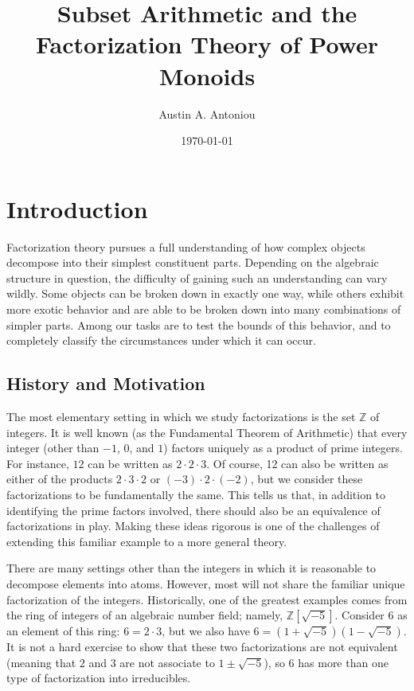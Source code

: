 \documentclass{report}
\title{Subset Arithmetic and the Factorization Theory of Power Monoids}
\author{Austin A. Antoniou}
\date{\today}
\newcommand{\ZZ}{\mathbb{Z}}
\renewcommand{\:}{\text{:}}
\theoremstyle{definition}
\begin{document}
\maketitle

\tableofcontents


\chapter{Introduction}

Factorization theory pursues a full understanding of how complex objects decompose into their simplest constituent parts.  
Depending on the algebraic structure in question, the difficulty of gaining such an understanding can vary wildly. 
Some objects can be broken down in exactly one way, while others exhibit more exotic behavior and are able to be broken down into many combinations of simpler parts.
Among our tasks are to test the bounds of this behavior, and to completely classify the circumstances under which it can occur.


\section{History and Motivation}

The most elementary setting in which we study factorizations is the set $\ZZ$ of integers.
It is well known (as the Fundamental Theorem of Arithmetic) that every integer (other than $-1$, $0$, and $1$) factors uniquely as a product of prime integers.
For instance, $12$ can be written as $2\cdot 2\cdot 3$.
Of course, 12 can also be written as either of the products $2\cdot 3\cdot 2$ or $(-3)\cdot 2\cdot (-2)$, but we consider these factorizations to be fundamentally the same.  
This tells us that, in addition to identifying the prime factors involved, there should also be an equivalence of factorizations in play.
Making these ideas rigorous is one of the challenges of extending this familiar example to a more general theory.


There are many settings other than the integers in which it is reasonable to decompose elements into atoms. 
However, most will not share the familiar unique factorization of the integers.  
Historically, one of the greatest examples comes from the ring of integers of an algebraic number field; namely, $\ZZ[\sqrt{-5}]$.
Consider $6$ as an element of this ring: $6=2\cdot3$, but we also have $6 = (1+\sqrt{-5})(1-\sqrt{-5})$.
It is not a hard exercise to show that these two factorizations are not equivalent (meaning that $2$ and $3$ are not associate to $1\pm\sqrt{-5}$), so $6$ has more than one type of factorization into irreducibles.
\end{document}
